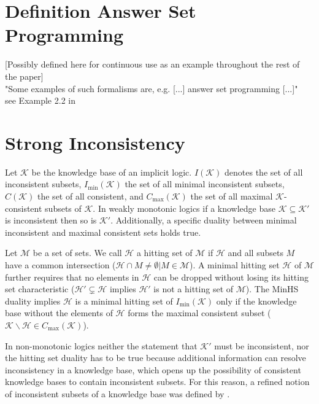 \section{Definition Answer Set Programming}
 [Possibly defined here for continuous use as an example throughout the rest of the paper]
\\
"Some examples of such formalisms are, e.g. [...] answer set programming \cite{gelfond_logic_2002} [...]"
\\
see Example 2.2 in \cite{ulbricht_measuring_2018}

\section{Strong Inconsistency}
Let \(\mathcal{K}\) be the knowledge base of an implicit logic. \(I(\mathcal{K})\) denotes the set of all inconsistent subsets, \(I_{\min}(\mathcal{K})\) the set of all minimal inconsistent subsets, \(C(\mathcal{K})\) the set of all consistent, and \(C_{\max}(\mathcal{K})\) the set of all maximal \(\mathcal{K}\)-consistent subsets of \(\mathcal{K}\). In weakly monotonic logics if a knowledge base \(\mathcal{K} \subseteq \mathcal{K}'\) is inconsistent then so is \(\mathcal{K}'\). Additionally, a specific duality between minimal inconsistent and maximal consistent sets holds true.

Let \(\mathcal{M}\) be a set of sets. We call \(\mathcal{H}\) a hitting set of \(\mathcal{M}\) if \(\mathcal{H}\) and all subsets \(M\) have a common intersection (\(\mathcal{H} \cap M \neq \emptyset | M \in \mathcal{M}\)). A minimal hitting set \(\mathcal{H}\) of \(\mathcal{M}\) further requires that no elements in \(\mathcal{H}\) can be dropped without losing its hitting set characteristic (\(\mathcal{H}' \subsetneq \mathcal{H}\) implies \(\mathcal{H}'\) is not a hitting set of \(\mathcal{M}\)). The MinHS duality \cite{reiter_theory_1987} implies \(\mathcal{H}\) is a minimal hitting set of \(I_{\min}(\mathcal{K})\) only if the knowledge base without the elements of \(\mathcal{H}\) forms the maximal consistent subset (\(\mathcal{K} \backslash \mathcal{H} \in C_{\max}(\mathcal{K})\)).

In non-monotonic logics neither the statement that \(\mathcal{K}'\) must be inconsistent, nor the hitting set duality has to be true because additional information can resolve inconsistency in a knowledge base, which opens up the possibility of consistent knowledge bases to contain inconsistent subsets. For this reason, a refined notion of inconsistent subsets of a knowledge base was defined by \cite{brewka_strong_2017}.

